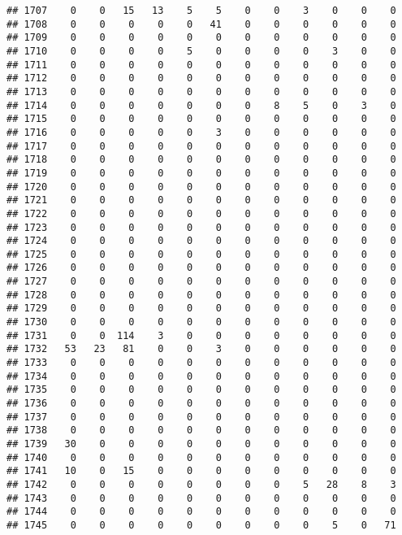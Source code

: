 \documentclass[]{article}
\begin{document}
\begin{verbatim}
## 1707    0    0   15   13    5    5    0    0    3    0    0    0
## 1708    0    0    0    0    0   41    0    0    0    0    0    0
## 1709    0    0    0    0    0    0    0    0    0    0    0    0
## 1710    0    0    0    0    5    0    0    0    0    3    0    0
## 1711    0    0    0    0    0    0    0    0    0    0    0    0
## 1712    0    0    0    0    0    0    0    0    0    0    0    0
## 1713    0    0    0    0    0    0    0    0    0    0    0    0
## 1714    0    0    0    0    0    0    0    8    5    0    3    0
## 1715    0    0    0    0    0    0    0    0    0    0    0    0
## 1716    0    0    0    0    0    3    0    0    0    0    0    0
## 1717    0    0    0    0    0    0    0    0    0    0    0    0
## 1718    0    0    0    0    0    0    0    0    0    0    0    0
## 1719    0    0    0    0    0    0    0    0    0    0    0    0
## 1720    0    0    0    0    0    0    0    0    0    0    0    0
## 1721    0    0    0    0    0    0    0    0    0    0    0    0
## 1722    0    0    0    0    0    0    0    0    0    0    0    0
## 1723    0    0    0    0    0    0    0    0    0    0    0    0
## 1724    0    0    0    0    0    0    0    0    0    0    0    0
## 1725    0    0    0    0    0    0    0    0    0    0    0    0
## 1726    0    0    0    0    0    0    0    0    0    0    0    0
## 1727    0    0    0    0    0    0    0    0    0    0    0    0
## 1728    0    0    0    0    0    0    0    0    0    0    0    0
## 1729    0    0    0    0    0    0    0    0    0    0    0    0
## 1730    0    0    0    0    0    0    0    0    0    0    0    0
## 1731    0    0  114    3    0    0    0    0    0    0    0    0
## 1732   53   23   81    0    0    3    0    0    0    0    0    0
## 1733    0    0    0    0    0    0    0    0    0    0    0    0
## 1734    0    0    0    0    0    0    0    0    0    0    0    0
## 1735    0    0    0    0    0    0    0    0    0    0    0    0
## 1736    0    0    0    0    0    0    0    0    0    0    0    0
## 1737    0    0    0    0    0    0    0    0    0    0    0    0
## 1738    0    0    0    0    0    0    0    0    0    0    0    0
## 1739   30    0    0    0    0    0    0    0    0    0    0    0
## 1740    0    0    0    0    0    0    0    0    0    0    0    0
## 1741   10    0   15    0    0    0    0    0    0    0    0    0
## 1742    0    0    0    0    0    0    0    0    5   28    8    3
## 1743    0    0    0    0    0    0    0    0    0    0    0    0
## 1744    0    0    0    0    0    0    0    0    0    0    0    0
## 1745    0    0    0    0    0    0    0    0    0    5    0   71

\end{verbatim}
\end{document}
